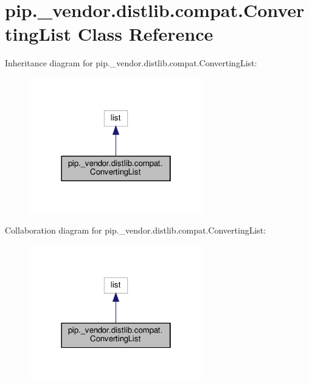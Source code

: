 \hypertarget{classpip_1_1__vendor_1_1distlib_1_1compat_1_1ConvertingList}{}\section{pip.\+\_\+vendor.\+distlib.\+compat.\+Converting\+List Class Reference}
\label{classpip_1_1__vendor_1_1distlib_1_1compat_1_1ConvertingList}


Inheritance diagram for pip.\+\_\+vendor.\+distlib.\+compat.\+Converting\+List\+:
\nopagebreak
\begin{figure}[H]
\begin{center}
\leavevmode
\includegraphics[width=214pt]{classpip_1_1__vendor_1_1distlib_1_1compat_1_1ConvertingList__inherit__graph}
\end{center}
\end{figure}


Collaboration diagram for pip.\+\_\+vendor.\+distlib.\+compat.\+Converting\+List\+:
\nopagebreak
\begin{figure}[H]
\begin{center}
\leavevmode
\includegraphics[width=214pt]{classpip_1_1__vendor_1_1distlib_1_1compat_1_1ConvertingList__coll__graph}
\end{center}
\end{figure}
